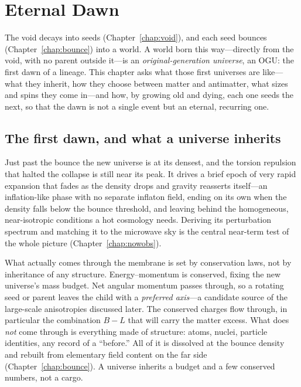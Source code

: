 \chapter{Eternal Dawn}
\label{chap:dawn}

The void decays into seeds (Chapter~\ref{chap:void}), and each seed bounces
(Chapter~\ref{chap:bounce}) into a world. A world born this way---directly from
the void, with no parent outside it---is an \emph{original-generation universe},
an OGU: the first dawn of a lineage. This chapter asks what those first universes
are like---what they inherit, how they choose between matter and antimatter, what
sizes and spins they come in---and how, by growing old and dying, each one seeds
the next, so that the dawn is not a single event but an eternal, recurring one.

\section{The first dawn, and what a universe inherits}
\label{sec:first-dawn}

Just past the bounce the new universe is at its densest, and the torsion
repulsion that halted the collapse is still near its peak. It drives a brief
epoch of very rapid expansion that fades as the density drops and gravity
reasserts itself---an inflation-like phase with no separate inflaton field,
ending on its own when the density falls below the bounce threshold, and leaving
behind the homogeneous, near-isotropic conditions a hot cosmology needs. Deriving
its perturbation spectrum and matching it to the microwave sky is the central
near-term test of the whole picture (Chapter~\ref{chap:nowobs}).

What actually comes through the membrane is set by conservation laws, not by
inheritance of any structure. Energy--momentum is conserved, fixing the new
universe's mass budget. Net angular momentum passes through, so a rotating seed or
parent leaves the child with a \emph{preferred axis}---a candidate source of the
large-scale anisotropies discussed later. The conserved charges flow through, in
particular the combination $B-L$ that will carry the matter excess. What does
\emph{not} come through is everything made of structure: atoms, nuclei, particle
identities, any record of a ``before.'' All of it is dissolved at the bounce
density and rebuilt from elementary field content on the far side
(Chapter~\ref{chap:bounce}). A universe inherits a budget and a few conserved
numbers, not a cargo.

